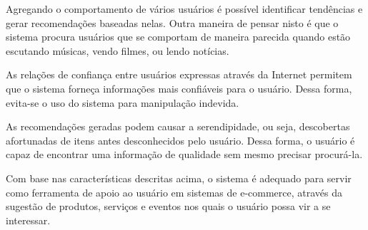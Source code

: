  Agregando o comportamento de vários usuários é possível identificar tendências e gerar recomendações baseadas nelas. Outra maneira de pensar nisto é que o sistema procura usuários que se comportam de maneira parecida quando estão escutando músicas, vendo filmes, ou lendo notícias.
 
 As relações de confiança entre usuários expressas através da Internet permitem que o sistema forneça informações mais confiáveis para o usuário. Dessa forma, evita-se o uso do sistema para manipulação indevida.

 As recomendações geradas podem causar a serendipidade, ou seja, descobertas afortunadas de itens antes desconhecidos pelo usuário. Dessa forma, o usuário é capaz de encontrar uma informação de qualidade sem mesmo precisar procurá-la.

 Com base nas características descritas acima, o sistema é adequado para servir como ferramenta de apoio ao usuário em sistemas de e-commerce, através da sugestão de produtos, serviços e eventos nos quais o usuário possa vir a se interessar.
